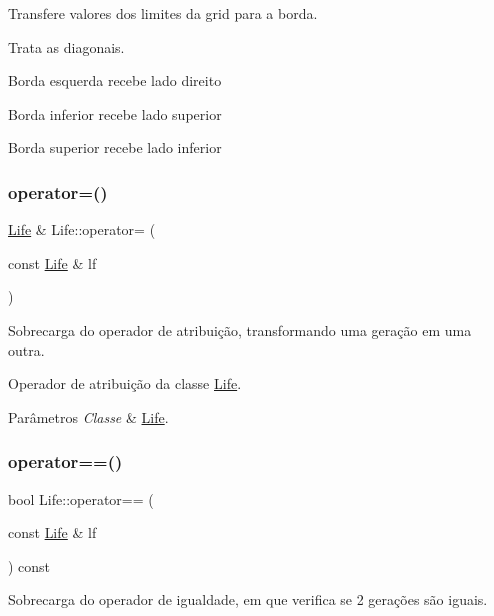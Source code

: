 Transfere valores dos limites da grid para a borda. 

Trata as diagonais.

Borda esquerda recebe lado direito

Borda inferior recebe lado superior

Borda superior recebe lado inferior \mbox{\label{classLife_a79902e1e85146df19fb2b920899a5a36}} 
\subsubsection{\texorpdfstring{operator=()}{operator=()}}
{\footnotesize\ttfamily \hyperlink{classLife}{Life} \& Life\+::operator= (\begin{DoxyParamCaption}\item[{const \hyperlink{classLife}{Life} \&}]{lf }\end{DoxyParamCaption})}



Sobrecarga do operador de atribuição, transformando uma geração em uma outra. 

Operador de atribuição da classe \hyperlink{classLife}{Life}. 
\begin{DoxyParams}{Parâmetros}
{\em Classe} & \hyperlink{classLife}{Life}. \\
\hline
\end{DoxyParams}
\mbox{\label{classLife_a50ef5ca2efcc8053b8d54fad159722cb}} 
\subsubsection{\texorpdfstring{operator==()}{operator==()}}
{\footnotesize\ttfamily bool Life\+::operator== (\begin{DoxyParamCaption}\item[{const \hyperlink{classLife}{Life} \&}]{lf }\end{DoxyParamCaption}) const}



Sobrecarga do operador de igualdade, em que verifica se 2 gerações são iguais. 

\mbox{\label{classLife_ae6230a18db54107b46db859424ccd4c3}} 
